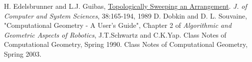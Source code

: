 \documentclass[12pt]{article}
\begin{document}
    \begin{thebibliography}{1}
        H. Edelsbrunner and  L.J. Guibas, \href{https://www.sciencedirect.com/science/article/pii/002200008990038X}{Topologically Sweeping an Arrangement}. {\it J. of Computer and System Sciences}, 38:165-194, 1989
        D. Dobkin and D. L. Souvaine, "Computational Geometry - A User's Guide", Chapter 2 of {\it Algorithmic and Geometric Aspects of Robotics}, J.T.Schwartz and C.K.Yap.
        Class Notes of Computational Geometry, Spring 1990.
        Class Notes of Computational Geometry, Spring 2003.
    \end{thebibliography}
\end{document}
